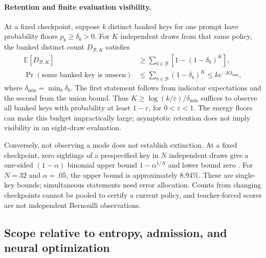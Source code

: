 \documentclass{article}
\newcommand{\1}{\mathbf 1}
\theoremstyle{remark}
\theoremstyle{definition}
\theoremstyle{plain}
\begin{document}
\paragraph{Retention and finite evaluation visibility.}
At a fixed checkpoint, suppose $k$ distinct banked keys for one prompt have
probability floors $p_b\ge\delta_b>0$. For $K$ independent draws from that
same policy, the banked distinct count $D_{\mathcal B,K}$ satisfies
\[
 \begin{aligned}
 \mathbb E[D_{\mathcal B,K}]
 &\ge\sum_{b\in\mathcal B}\left[1-(1-\delta_b)^K\right],\\
 \Pr(\text{some banked key is unseen})
 &\le\sum_{b\in\mathcal B}(1-\delta_b)^K
 \le k e^{-K\delta_{\min}},
 \end{aligned}
\]
where $\delta_{\min}=\min_b\delta_b$. The first statement follows from
indicator expectations and the second from the union bound. Thus
$K\ge\log(k/\varepsilon)/\delta_{\min}$ suffices to observe all banked keys
with probability at least $1-\varepsilon$, for $0<\varepsilon<1$.
The energy floors can make this budget impractically large; asymptotic
retention does not imply visibility in an eight-draw evaluation.

Conversely, not observing a mode does not establish extinction. At a fixed
checkpoint, zero sightings of a prespecified key in $N$ independent draws
give a one-sided $(1-\alpha)$ binomial upper bound
$1-\alpha^{1/N}$ and lower bound zero \citep{clopper1934binomial}. For
$N=32$ and $\alpha=.05$, the upper bound is approximately $8.94\%$.
These are single-key bounds; simultaneous statements need error allocation.
Counts from changing checkpoints cannot be pooled to certify a current
policy, and teacher-forced scores are not independent Bernoulli observations.

\subsection{Scope relative to entropy, admission, and neural optimization}
\label{app:theory-entropy}
\label{app:theory-entropy-comparison}
\end{document}
